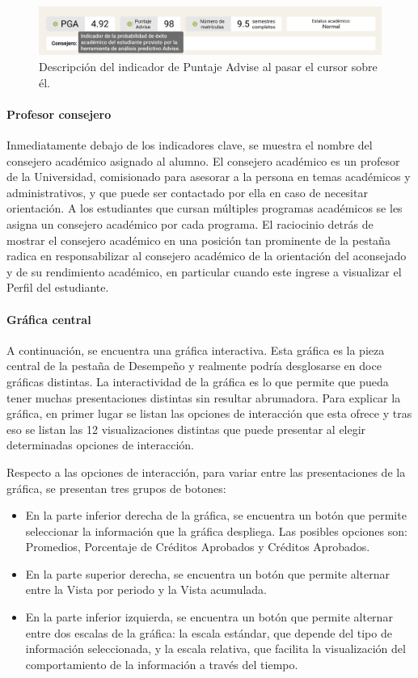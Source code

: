 \begin{figure}[H]
	\centering
	\includegraphics[width=\textwidth]{assets/nes/indicadores.png}
	\caption{Descripción del indicador de Puntaje Advise al pasar el cursor sobre él.}
	\label{fig:indicadores}
\end{figure}

\paragraph{Profesor consejero} Inmediatamente debajo de los indicadores clave, se muestra el nombre del consejero académico asignado al alumno. El consejero académico es un profesor de la Universidad, comisionado para asesorar a la persona en temas académicos y administrativos, y que puede ser contactado por ella en caso de necesitar orientación. A los estudiantes que cursan múltiples programas académicos se les asigna un consejero académico por cada programa. El raciocinio detrás de mostrar el consejero académico en una posición tan prominente de la pestaña radica en responsabilizar al consejero académico de la orientación del aconsejado y de su rendimiento académico, en particular cuando este ingrese a visualizar el Perfil del estudiante.

\paragraph{Gráfica central} A continuación, se encuentra una gráfica interactiva. Esta gráfica es la pieza central de la pestaña de Desempeño y realmente podría desglosarse en doce gráficas distintas. La interactividad de la gráfica es lo que permite que pueda tener muchas presentaciones distintas sin resultar abrumadora. Para explicar la gráfica, en primer lugar se listan las opciones de interacción que esta ofrece y tras eso se listan las 12 visualizaciones distintas que puede presentar al elegir determinadas opciones de interacción.

Respecto a las opciones de interacción, para variar entre las presentaciones de la gráfica, se presentan tres grupos de botones:
\begin{itemize}
	\item En la parte inferior derecha de la gráfica, se encuentra un botón que permite seleccionar la información que la gráfica despliega. Las posibles opciones son: Promedios, Porcentaje de Créditos Aprobados y Créditos Aprobados.
	\item En la parte superior derecha, se encuentra un botón que permite alternar entre la Vista por periodo y la Vista acumulada.
	\item En la parte inferior izquierda, se encuentra un botón que permite alternar entre dos escalas de la gráfica: la escala estándar, que depende del tipo de información seleccionada, y la escala relativa, que facilita la visualización del comportamiento de la información a través del tiempo.
\end{itemize}

